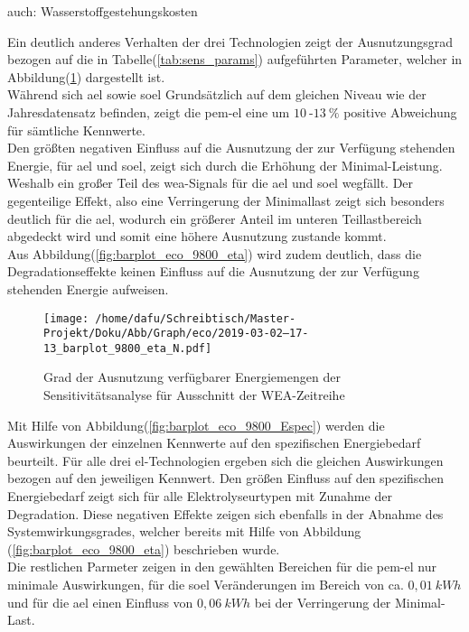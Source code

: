 \documentclass[onecolumn,10pt,titlepage]{article}
\begin{document}
auch: Wasserstoffgestehungskosten

Ein deutlich anderes Verhalten der drei Technologien zeigt der Ausnutzungsgrad  bezogen auf die in Tabelle(\ref{tab:sens_params}) aufgeführten Parameter, welcher in Abbildung(\ref{fig:barplot_eco_9800_etaN}) dargestellt ist. \\
Während sich \gls{ael} sowie \gls{soel} Grundsätzlich auf dem gleichen Niveau wie der Jahresdatensatz befinden, zeigt die \gls{pem}-\gls{el} eine um $10~$-$13~\%$ positive Abweichung für sämtliche Kennwerte.\\
Den größten negativen Einfluss auf die Ausnutzung der zur Verfügung stehenden Energie, für \gls{ael} und \gls{soel}, zeigt sich durch die Erhöhung der Minimal-Leistung. Weshalb ein großer Teil des \gls{wea}-Signals für die \gls{ael} und \gls{soel} wegfällt. Der gegenteilige Effekt, also eine Verringerung der Minimallast zeigt sich besonders deutlich für die \gls{ael}, wodurch ein größerer Anteil im unteren Teillastbereich abgedeckt wird und somit eine höhere Ausnutzung zustande kommt.\\
Aus Abbildung(\ref{fig:barplot_eco_9800_eta}) wird zudem deutlich, dass die Degradationseffekte keinen Einfluss auf die Ausnutzung der zur Verfügung stehenden Energie aufweisen. 
\begin{figure}[H]
	\centering
	\texttt{[image: /home/dafu/Schreibtisch/Master-Projekt/Doku/Abb/Graph/eco/2019-03-02--17-13\_barplot\_9800\_eta\_N.pdf]}
	\caption[Ausnutzungsgrad Sensitivitätsanalyse]{Grad der Ausnutzung verfügbarer Energiemengen der Sensitivitätsanalyse für Ausschnitt der WEA-Zeitreihe}
	\label{fig:barplot_eco_9800_etaN} 
\end{figure}
Mit Hilfe von Abbildung(\ref{fig:barplot_eco_9800_Espec}) werden die Auswirkungen der einzelnen Kennwerte auf den spezifischen Energiebedarf beurteilt. Für alle drei 
\gls{el}-Technologien ergeben sich die gleichen Auswirkungen bezogen auf den jeweiligen Kennwert. Den größen Einfluss auf den spezifischen Energiebedarf zeigt sich für alle Elektrolyseurtypen mit Zunahme der Degradation. Diese negativen Effekte zeigen sich ebenfalls in der Abnahme des Systemwirkungsgrades, welcher bereits mit Hilfe von Abbildung (\ref{fig:barplot_eco_9800_eta}) beschrieben wurde.\\
Die restlichen Parmeter zeigen in den gewählten Bereichen für die \gls{pem}-\gls{el} nur minimale Auswirkungen, für die \gls{soel} Veränderungen im Bereich von ca. $0,01~kWh$ und für die \gls{ael} einen Einfluss von $0,06~kWh$ bei der Verringerung der Minimal-Last. 
\end{document}
